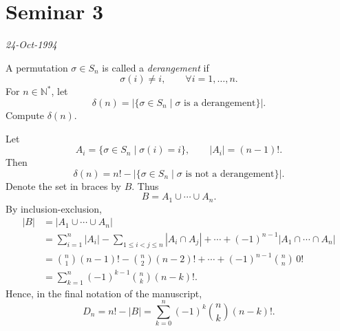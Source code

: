 
\section{Seminar 3}

\begin{flushright}
\textit{24-Oct-1994}
\end{flushright}

\noindent{}\quad A permutation $\sigma\in S_n$ is called a
\emph{derangement} if
\[
  \sigma(i)\neq i,\qquad \forall i=1,\ldots,n.
\]
For $n\in\mathbb N^{*}$, let
\[
 \delta(n)=\bigl|\{\sigma\in S_n\mid\sigma\text{ is a derangement}\}\bigr|.
\]
Compute $\delta(n)$.

\medskip
\noindent Let
\[
 A_i=\{\sigma\in S_n\mid\sigma(i)=i\},
 \qquad |A_i|=(n-1)!.
\]
Then
\[
 \delta(n)=n!-\bigl|\{\sigma\in S_n\mid
                   \sigma\text{ is not a derangement}\}\bigr|.
\]
Denote the set in braces by $B$. Thus
\[
 B=A_1\cup\cdots\cup A_n.
\]
By inclusion-exclusion,
\[
\begin{aligned}
 |B|
 &=|A_1\cup\cdots\cup A_n|\\
 &=\sum_{i=1}^{n}|A_i|
    -\sum_{1\le i<j\le n}|A_i\cap A_j|+\cdots
      +(-1)^{n-1}|A_1\cap\cdots\cap A_n|\\[3pt]
 &=\binom n1(n-1)!-\binom n2(n-2)!+\cdots
      +(-1)^{n-1}\binom nn\,0!\\[3pt]
 &=\sum_{k=1}^{n}(-1)^{k-1}\binom nk(n-k)!.
\end{aligned}
\]
Hence, in the final notation of the manuscript,
\[
 \boxed{D_n=n!-|B|=\sum_{k=0}^{n}(-1)^k\binom nk(n-k)!}.
\]

